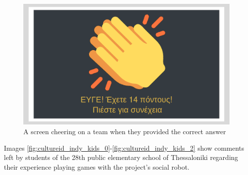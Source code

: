 \begin{figure}[H]\centering
  \includegraphics[scale=0.3]{images/cultureid/sc2.png}
  \caption{\small A screen cheering on a team when they provided the correct
           answer}
  \label{fig:cultureid_sc2}
\end{figure}

Images \ref{fig:cultureid_indy_kids_0}-\ref{fig:cultureid_indy_kids_2} show
comments left by students of the 28th public elementary school of Thessaloniki
regarding their experience playing games with the project's social robot.


